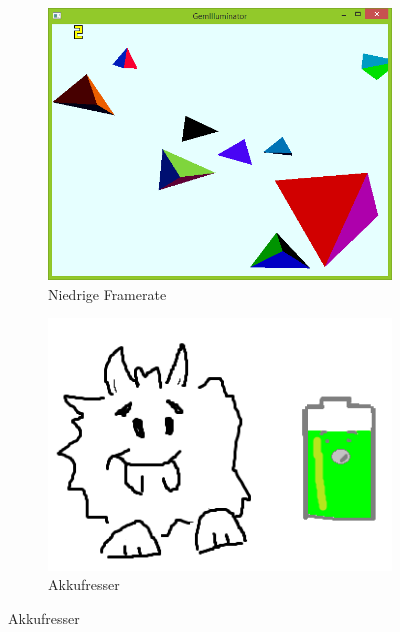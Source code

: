 {
	\begin{figure}
		\centering
		\begin{subfigure}{\textwidth}
			\centering
			\includegraphics[width=\textwidth, height=0.3\textheight, keepaspectratio]{images/lowFPS}
			\caption{Niedrige Framerate}
		\end{subfigure}
		\begin{subfigure}{\textwidth}
			\centering
			\includegraphics[width=\textwidth, height=0.3\textheight, keepaspectratio]{images/akkufresser}
			\caption{Akkufresser}
		\end{subfigure}
	\end{figure}
}



